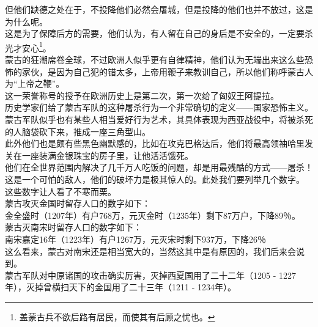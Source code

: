 \begin{multicols}{\theparacolNo}
但他们缺德之处在于，不投降他们必然会屠城，但是投降的他们也并不放过，这是为什么呢。\\

这是为了保障后方的需要，他们认为，有人留在自己的身后是不安全的，一定要杀光才安心\footnote{盖蒙古兵不欲后路有居民，而使其有后顾之忧也。}。\\

蒙古的狂潮席卷全球，不过欧洲人似乎更有自律精神，他们认为无端出来这么些恐怖的家伙，是因为自己犯的错太多，上帝用鞭子来教训自己，所以他们称呼蒙古人为“上帝之鞭”。\\

这一荣誉称号的授予在欧洲历史上是第二次，第一次给了匈奴王阿提拉。\\

历史学家们给了蒙古军队的这种屠杀行为一个非常确切的定义——国家恐怖主义。\\

蒙古军队似乎也有某些人相当爱好行为艺术，其具体表现为西亚战役中，将被杀死的人脑袋砍下来，推成一座三角型山。\\

此外他们也是颇有些黑色幽默感的，比如在攻克巴格达后，他们将最高领袖哈里发关在一座装满金银珠宝的房子里，让他活活饿死。\\

他们在全世界范围内解决了几千万人吃饭的问题，却是用最残酷的方式——屠杀！\\

这是一个可怕的敌人，他们的破坏力是极其惊人的。此处我们要列举几个数字。\\

这些数字让人看了不寒而栗。\\

蒙古攻灭金国时留存人口的数字如下：\\

金全盛时（1207年）有户768万，元灭金时（1235年）剩下87万户，下降89％。\\

蒙古灭南宋时留存人口的数字如下：\\

南宋嘉定16年（1223年）有户1267万，元灭宋时剩下937万，下降26％\\

这么看来，蒙古对南宋还是相当宽大的，当然这其中是有原因的，我们后来会说到。\\

蒙古军队对中原诸国的攻击确实厉害，灭掉西夏国用了二十二年（1205 - 1227年），灭掉曾横扫天下的金国用了二十三年（1211 - 1234年）。\\


\end{multicols}

